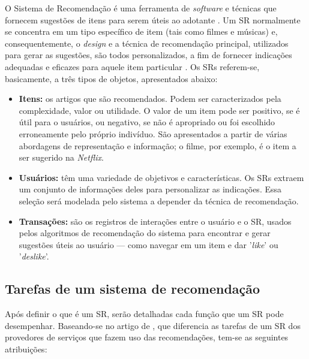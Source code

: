 \documentclass[portuguese]{textolivre}
\begin{document}
O Sistema de Recomendação é uma ferramenta de \textit{software} e técnicas que fornecem sugestões de itens para serem úteis ao adotante \cite{Ricci2011}. Um SR normalmente se concentra em um tipo específico de item (tais como filmes e músicas) e, consequentemente, o \textit{design} e a técnica de recomendação principal, utilizados para gerar as sugestões, são todos personalizados, a fim de fornecer indicações adequadas e eficazes para aquele item particular \cite{Ricci2011}. Os SRs referem-se, basicamente, a três tipos de objetos, apresentados abaixo:

\begin{itemize}
    \item \textbf{Itens:} os artigos que são recomendados. Podem ser caracterizados pela complexidade, valor ou utilidade. O valor de um item pode ser positivo, se é útil para o usuários, ou negativo, se não é apropriado ou foi escolhido erroneamente pelo próprio indivíduo. São apresentados a partir de várias abordagens de representação e informação; o filme, por exemplo, é o item a ser sugerido na \emph{Netflix}.

\item \textbf{Usuários:} têm uma variedade de objetivos e características. Os SRs extraem um conjunto de informações deles para personalizar as indicações. Essa seleção será modelada pelo sistema a depender da técnica de recomendação. 

\item \textbf{Transações:} são os registros de interações entre o usuário e o SR, usados pelos algoritmos de recomendação do sistema para encontrar e gerar sugestões úteis ao usuário — como navegar em um item e dar '\emph{like}' ou '\emph{deslike}'.
\end{itemize}
     
     
\subsection{Tarefas de um sistema de recomendação}

Após definir o que é um SR, serão detalhadas cada função que um SR pode desempenhar. Baseando-se no artigo de \textcite{Ricci2011}, que diferencia as tarefas de um SR dos provedores de serviços que fazem uso das recomendações, tem-se as seguintes atribuições: 
\end{document}
